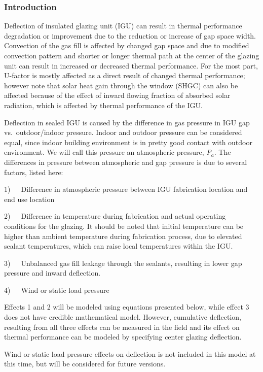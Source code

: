 \subsubsection{Introduction}\label{introduction-002}

Deflection of insulated glazing unit (IGU) can result in thermal performance degradation or improvement due to the reduction or increase of gap space width. Convection of the gas fill is affected by changed gap space and due to modified convection pattern and shorter or longer thermal path at the center of the glazing unit can result in increased or decreased thermal performance. For the most part, U-factor is mostly affected as a direct result of changed thermal performance; however note that solar heat gain through the window (SHGC) can also be affected because of the effect of inward flowing fraction of absorbed solar radiation, which is affected by thermal performance of the IGU.

Deflection in sealed IGU is caused by the difference in gas pressure in IGU gap vs.~outdoor/indoor pressure. Indoor and outdoor pressure can be considered equal, since indoor building environment is in pretty good contact with outdoor environment. We will call this pressure an atmospheric pressure, \emph{P\(_{a}\)}. The differences in pressure between atmospheric and gap pressure is due to several factors, listed here:

1)~~~Difference in atmospheric pressure between IGU fabrication location and end use location

2)~~~Difference in temperature during fabrication and actual operating conditions for the glazing. It should be noted that initial temperature can be higher than ambient temperature during fabrication process, due to elevated sealant temperatures, which can raise local temperatures within the IGU.

3)~~~Unbalanced gas fill leakage through the sealants, resulting in lower gap pressure and inward deflection.

4)~~~Wind or static load pressure

Effects 1 and 2 will be modeled using equations presented below, while effect 3 does not have credible mathematical model. However, cumulative deflection, resulting from all three effects can be measured in the field and its effect on thermal performance can be modeled by specifying center glazing deflection.

Wind or static load pressure effects on deflection is not included in this model at this time, but will be considered for future versions.

